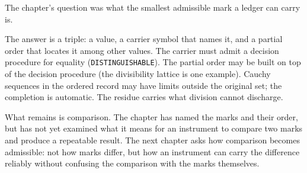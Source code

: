 \begin{bridge}

The chapter's question was what the smallest admissible mark a ledger can
carry is.

The answer is a triple: a value, a carrier symbol that names it, and a
partial order that locates it among other values. The carrier must
admit a decision procedure for equality (\texttt{DISTINGUISHABLE}). The
partial order may be built on top of the decision procedure (the
divisibility lattice is one example). Cauchy sequences in the ordered
record may have limits outside the original set; the completion is
automatic. The residue carries what division cannot discharge.

What remains is comparison. The chapter has named the marks and their
order, but has not yet examined what it means for an instrument to
compare two marks and produce a repeatable result. The next chapter
asks how comparison becomes admissible: not how marks differ, but how
an instrument can carry the difference reliably without confusing the
comparison with the marks themselves.

\end{bridge}

